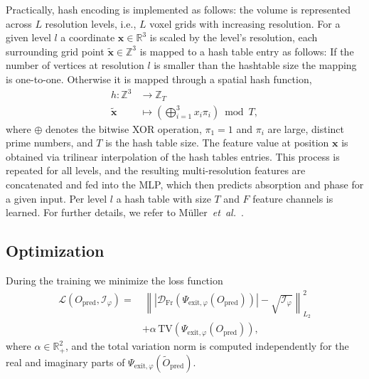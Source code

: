 \documentclass{article}
\begin{document}
Practically, hash encoding is implemented as follows:  
the volume is represented across $L$ resolution levels, i.e., $L$ voxel grids with increasing resolution.  
For a given level $l$ a coordinate $\mathbf{x} \in \mathbb{R}^{3}$ is scaled by the level's resolution, each surrounding grid point $\tilde{\mathbf{x}} \in \mathbb{Z}^{3}$ is mapped to a hash table entry as follows:
If the number of vertices at resolution $l$ is smaller than the hashtable size the mapping is one-to-one.
Otherwise it is mapped through a spatial hash function,
\begin{equation}
\begin{split}
h : \mathbb{Z}^{3} &\rightarrow \mathbb{Z}_{T} \\
\tilde{\mathbf{x}} &\mapsto \left( \bigoplus_{i=1}^{3} x_{i} \pi_{i} \right) \bmod T,
\end{split}
\end{equation}
where $\oplus$ denotes the bitwise XOR operation, $\pi_{1}=1$ and $\pi_{i}$ are large, distinct prime numbers, and $T$ is the hash table size.  
The feature value at position $\mathbf{x}$ is obtained via trilinear interpolation of the hash tables entries.  
This process is repeated for all levels, and the resulting multi-resolution features are concatenated and fed into the MLP, which then predicts absorption and phase for a given input.
Per level $l$ a hash table with size $T$ and $F$ feature channels is learned.  
For further details, we refer to Müller~\textit{et~al.}~\cite{mullerInstantNeuralGraphics2022}.  

\subsection{Optimization}
During the training we minimize the loss function 
\begin{equation}
	\begin{split}
\mathcal{L}\!\left( O_{\mathrm{pred}}, \mathcal{I}_\varphi \right)
 = &\, 
 \left\|
 \left|
 \mathcal{D}_{\mathrm{Fr}}\!\left(
 \Psi_{\mathrm{exit}, \varphi}\!\left(
 O_{\mathrm{pred}}
 \right)
 \right)
 \right|
 -
 \sqrt{\mathcal{I}_\varphi}
 \right\|_{L_{2}}^{2} \\[0.5em]
   & + \alpha\, \mathrm{TV}\!\left(
 \Psi_{\mathrm{exit}, \varphi}\!\left(
 O_{\mathrm{pred}}
 \right)
 \right),
 \label{eq:loss}
\end{split}
\end{equation}
where $\alpha \in \mathbb{R}_{+}^{2}$, and the total variation norm is computed independently for the real and imaginary parts of $\Psi_{\mathrm{exit}, \varphi}\!\left( \tilde{O}_{\mathrm{pred}} \right)$.  
 
\end{document}
